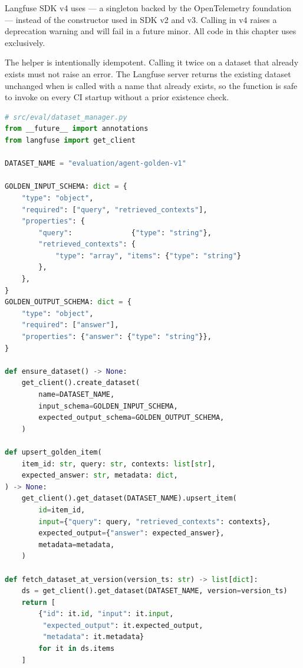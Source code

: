\begin{warningbox}
Langfuse SDK v4 uses  --- a singleton backed by the
OpenTelemetry foundation --- instead of the  constructor
used in SDK v2 and v3.  Calling  in v4 raises a
deprecation warning and will fail in a future minor.  All code in this
chapter uses  exclusively.
\end{warningbox}

The  helper is intentionally idempotent.  Calling it
twice on a dataset that already exists must not raise an error.
The Langfuse server returns the existing dataset unchanged when
 is called with a name that already exists, so the
function is safe to invoke on every CI startup without a prior existence
check.

\begin{lstlisting}[language=Python, caption={Dataset manager: schema
    enforcement\, idempotent creation\, and version-pinned fetch},
    label={lst:dataset-manager}]
# src/eval/dataset_manager.py
from __future__ import annotations
from langfuse import get_client

DATASET_NAME = "evaluation/agent-golden-v1"

GOLDEN_INPUT_SCHEMA: dict = {
    "type": "object",
    "required": ["query", "retrieved_contexts"],
    "properties": {
        "query":              {"type": "string"},
        "retrieved_contexts": {
            "type": "array", "items": {"type": "string"}
        },
    },
}
GOLDEN_OUTPUT_SCHEMA: dict = {
    "type": "object",
    "required": ["answer"],
    "properties": {"answer": {"type": "string"}},
}

def ensure_dataset() -> None:
    get_client().create_dataset(
        name=DATASET_NAME,
        input_schema=GOLDEN_INPUT_SCHEMA,
        expected_output_schema=GOLDEN_OUTPUT_SCHEMA,
    )

def upsert_golden_item(
    item_id: str, query: str, contexts: list[str],
    expected_answer: str, metadata: dict,
) -> None:
    get_client().get_dataset(DATASET_NAME).upsert_item(
        id=item_id,
        input={"query": query, "retrieved_contexts": contexts},
        expected_output={"answer": expected_answer},
        metadata=metadata,
    )

def fetch_dataset_at_version(version_ts: str) -> list[dict]:
    ds = get_client().get_dataset(DATASET_NAME, version=version_ts)
    return [
        {"id": it.id, "input": it.input,
         "expected_output": it.expected_output,
         "metadata": it.metadata}
        for it in ds.items
    ]
\end{lstlisting}

